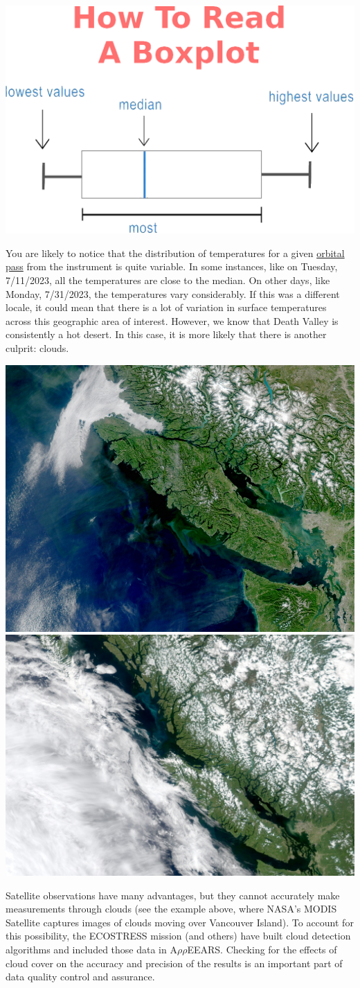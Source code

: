 \documentclass[oneside,a4paper,11pt,explicit]{book}
\begin{document}
\centerline{\includegraphics[width=.5\textwidth]{HowToBoxplot.png}}

\begin{tcolorbox}[colback=yellow!5!white,colframe=IceCreamLeaf,title=\textbf{Cloudy Conditions}]
You are likely to notice that the distribution of temperatures for a given \href{https://en.wikipedia.org/wiki/Orbital_pass}{orbital pass} from the instrument is quite variable. In some instances, like on Tuesday, 7/11/2023, all the temperatures are close to the median. On other days, like Monday, 7/31/2023, the temperatures vary considerably. If this was a different locale, it could mean that there is a lot of variation in surface temperatures across this geographic area of interest. However, we know that Death Valley is consistently a hot desert. In this case, it is more likely that there is another culprit: clouds.

\vspace{1em}

\centerline{\includegraphics[width=.475\textwidth]{I201625621_250_acor_map_comp.jpg} \includegraphics[width=.525\textwidth]{I201517422_250_acor_map_comp.jpg}}

\vspace{1em}

Satellite observations have many advantages, but they cannot accurately make measurements through clouds (see the example above, where NASA's MODIS Satellite captures images of clouds moving over Vancouver Island). To account for this possibility, the ECOSTRESS mission (and others) have built cloud detection algorithms and included those data in A$\rho\rho$EEARS. Checking for the effects of cloud cover on the accuracy and precision of the results is an important part of data quality control and assurance. 
\end{tcolorbox}
\end{document}
